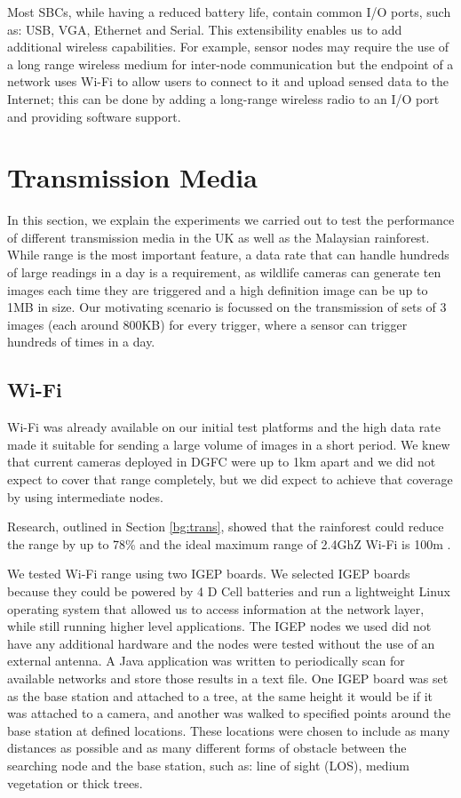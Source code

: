 Most SBCs, while having a reduced battery life, contain common I/O ports, such as: USB, VGA, Ethernet and Serial. This extensibility enables us to add additional wireless capabilities. For example, sensor nodes may require the use of a long range wireless medium for inter-node communication but the endpoint of a network uses Wi-Fi to allow users to connect to it and upload sensed data to the Internet; this can be done by adding a long-range wireless radio to an I/O port and providing software support.

\section{Transmission Media}\label{tech:wireless}
	In this section, we explain the experiments we carried out to test the performance of different transmission media in the UK as well as the Malaysian rainforest. While range is the most important feature, a data rate that can handle hundreds of large readings in a day is a requirement, as wildlife cameras can generate ten images each time they are triggered and a high definition image can be up to 1MB in size. Our motivating scenario is focussed on the transmission of sets of 3 images (each around 800KB) for every trigger, where a sensor can trigger hundreds of times in a day.

\subsection{Wi-Fi}\label{tech:wifi}
Wi-Fi was already available on our initial test platforms and the high data rate made it suitable for sending a large volume of images in a short period. We knew that current cameras deployed in DGFC were up to 1km apart and we did not expect to cover that range completely, but we did expect to achieve that coverage by using intermediate nodes.

Research, outlined in Section \ref{bg:trans}, showed that the rainforest could reduce the range by up to 78\% and the ideal maximum range of 2.4GhZ Wi-Fi is 100m \cite{Dhawan2007}. 

We tested Wi-Fi range using two IGEP boards. We selected IGEP boards because they could be powered by 4 D Cell batteries and run a lightweight Linux operating system that allowed us to access information at the network layer, while still running higher level applications. The IGEP nodes we used did not have any additional hardware and the nodes were tested without the use of an external antenna. A Java application was written to periodically scan for available networks and store those results in a text file. One IGEP board was set as the base station and attached to a tree, at the same height it would be if it was attached to a camera, and another was walked to specified points around the base station at defined locations. These locations were chosen to include as many distances as possible and as many different forms of obstacle between the searching node and the base station, such as: line of sight (LOS), medium vegetation or thick trees.
			
